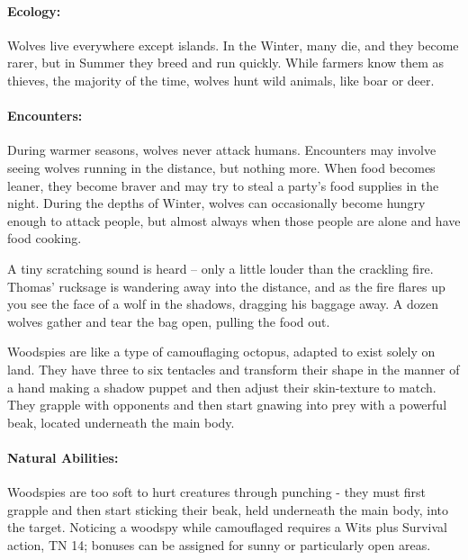 \begin{multicols}{2}
\mouthdigger

\label{wolf}

\paragraph{Ecology:} Wolves live everywhere except islands.  In the Winter, many die, and they become rarer, but in Summer they breed and run quickly.  While farmers know them as thieves, the majority of the time, wolves hunt wild animals, like boar or deer.

\wolf

\paragraph{Encounters:} During warmer seasons, wolves never attack humans.  Encounters may involve seeing wolves running in the distance, but nothing more.  When food becomes leaner, they become braver and may try to steal a party's food supplies in the night.  During the depths of Winter, wolves can occasionally become hungry enough to attack people, but almost always when those people are alone and have food cooking.

\begin{boxtext}

	A tiny scratching sound is heard -- only a little louder than the crackling fire.  Thomas' rucksage is wandering away into the distance, and as the fire flares up you see the face of a wolf in the shadows, dragging his baggage away.  A dozen wolves gather and tear the bag open, pulling the food out.

\end{boxtext}

\label{woodspy}
\woodspy

Woodspies are like a type of camouflaging octopus, adapted to exist solely on land.  They have three to six tentacles and transform their shape in the manner of a hand making a shadow puppet and then adjust their skin-texture to match.  They grapple with opponents and then start gnawing into prey with a powerful beak, located underneath the main body.

\paragraph{Natural Abilities:} Woodspies are too soft to hurt creatures through punching - they must first grapple and then start sticking their beak, held underneath the main body, into the target.  Noticing a woodspy while camouflaged requires a Wits plus Survival action, TN 14; bonuses can be assigned for sunny or particularly open areas.


\end{multicols}
